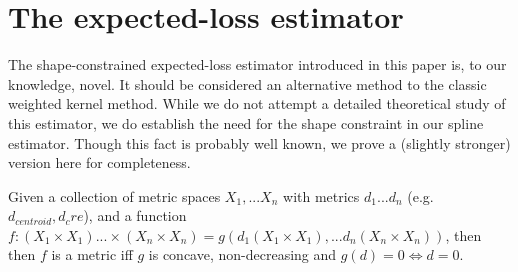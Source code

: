\documentclass{article}
\begin{document}
\newpage



\section{The expected-loss estimator}
\label{supp_sec:el}
The shape-constrained expected-loss estimator introduced in this paper is, to our knowledge, novel.  It should be considered an alternative method to the classic weighted kernel method. While we do not attempt a detailed theoretical study of this estimator, we do establish the need for the shape constraint in our spline estimator. Though this fact is probably well known, we prove a (slightly stronger) version here for completeness.


Given a collection of metric spaces $X_1, ... X_n$ with metrics $d_1 ... d_n$ (e.g. $d_{centroid}, d_cre$), and a function $f: (X_1 \times X_1) ... \times (X_n  \times X_n) = g(d_1(X_1 \times X_1),... d_n(X_n \times X_n))$, then then $f$ is a metric iff $g$ is concave, non-decreasing and $g(d) = 0 \Longleftrightarrow d = 0$.
\end{document}
